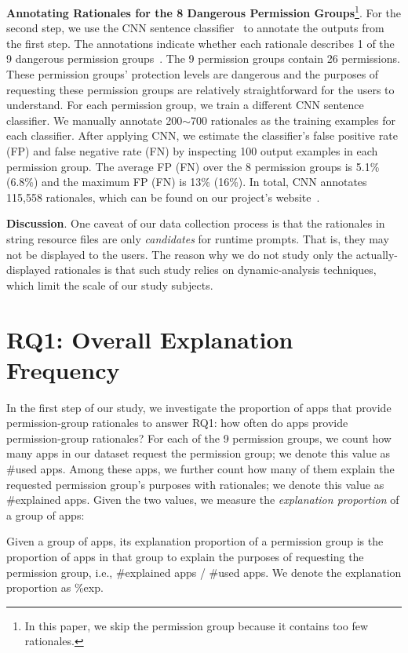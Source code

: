 \textbf{Annotating Rationales for the 8 Dangerous Permission Groups}\footnote{In this paper, we skip the  permission group because it contains too few rationales.}. 
For the second step, we use the CNN sentence classifier~\cite{cnn,kim2014convolutional} to annotate the outputs from the first step. The annotations indicate whether each rationale describes 1 of the 9 dangerous permission groups~\cite{permgroup}. 
The 9 permission groups contain 26 permissions. These permission groups' protection levels are dangerous and the purposes of requesting these permission groups are relatively straightforward for the users to understand. 
For each permission group, we train a different CNN sentence classifier. 
We manually annotate 200$\sim$700 rationales as the training examples for each classifier. 
After applying CNN, we estimate the classifier's false positive rate (FP) and false negative rate (FN) by inspecting 100 output examples in each permission group. The average FP (FN) over the 8 permission groups is 5.1\% (6.8\%) and the maximum FP (FN) is 13\% (16\%). In total, CNN annotates 115,558 rationales, which can be found on our project's website~\cite{runtimeproj}. 

\textbf{Discussion}. One caveat of our data collection process is that the rationales in string resource files are only \emph{candidates} for runtime prompts. 
That is, they may not be displayed to the users. 
The reason why we do not study only the actually-displayed rationales is that such study relies on dynamic-analysis techniques, which limit the scale of our study subjects.

\section{RQ1: Overall Explanation Frequency}
\label{sec:rq1}

In the first step of our study, we investigate the proportion of apps that provide permission-group rationales to answer RQ1: how often do apps provide permission-group rationales?  
For each of the 9 permission groups, we count how many apps in our dataset request the permission group; 
we denote this value as \textsf{\#used apps}. Among these apps, we further count how many of them explain the requested permission group's purposes with rationales; 
we denote this value as \textsf{\#explained apps}. Given the two values, we measure the \emph{explanation proportion} of a group of apps:

\begin{mydef}
Given a group of apps, its explanation proportion of a permission group is the proportion of apps in that group to explain the purposes of requesting the permission group,  
i.e., \textsf{\#explained apps} / \textsf{\#used apps}. We denote the explanation proportion as \textsf{\%exp}. 
\end{mydef}

